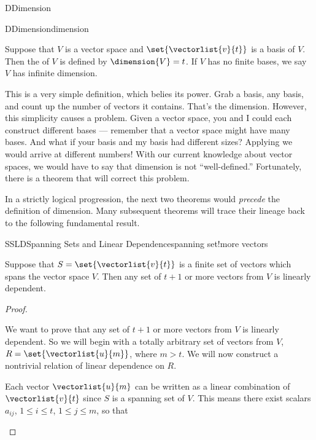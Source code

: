 \begin{subsect}{D}{Dimension}
%
\begin{definition}{D}{Dimension}{dimension}
\begin{para}Suppose that $V$ is a vector space and $\set{\vectorlist{v}{t}}$ is a basis of $V$.  Then the  of $V$ is defined by $\dimension{V}=t$.  If $V$ has no finite bases, we say $V$ has infinite dimension.\end{para}
\end{definition}
%
\begin{para}This is a very simple definition, which belies its power.  Grab a basis, any basis, and count up the number of vectors it contains.  That's the dimension.  However, this simplicity causes a problem.  Given a vector space, you and I could each construct different bases --- remember that a vector space might have many bases.  And what if your basis and my basis had different sizes?  Applying  we would arrive at different numbers!  With our current knowledge about vector spaces, we would have to say that dimension is not ``well-defined.''  Fortunately, there is a theorem that will correct this problem.\end{para}
%
\begin{para}In a strictly logical progression, the next two theorems would {\em precede} the definition of dimension.  Many subsequent theorems will trace their lineage back to the following fundamental result.\end{para}
%
\begin{theorem}{SSLD}{Spanning Sets and Linear Dependence}{spanning set!more vectors}
\begin{para}Suppose that $S=\set{\vectorlist{v}{t}}$ is a finite set of vectors which spans the vector space $V$.  Then any set of $t+1$ or more vectors from $V$ is linearly dependent.\end{para}
\end{theorem}
%
\begin{proof}
\begin{para}We want to prove that any set of $t+1$ or more vectors from $V$ is linearly dependent.  So we will begin with a totally arbitrary set of vectors from $V$, $R=\set{\vectorlist{u}{m}}$, where $m>t$.  We will now construct a nontrivial relation of linear dependence on $R$.\end{para}
%
\begin{para}Each vector $\vectorlist{u}{m}$ can be written as a linear combination of $\vectorlist{v}{t}$ since $S$ is a spanning set of $V$.  This means there exist scalars  $a_{ij}$, $1\leq i\leq t$, $1\leq j\leq m$, so that

\end{para}
\end{proof}
\end{subsect}
